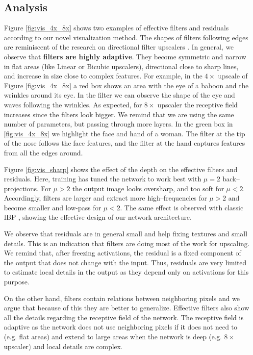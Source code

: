 \documentclass[letterpaper]{article}
\begin{document}
\subsection{Analysis}
\label{ssec:analysis}
Figure \ref{fig:vis_4x_8x} shows two examples of effective filters and residuals according to our novel visualization method. The shapes of filters following edges are reminiscent of the research on directional filter upscalers \cite{VRAlgazi_1991a,XLi_2001a}. In general, we observe that \textbf{filters are highly adaptive}. They become symmetric and narrow in flat areas (like Linear or Bicubic upscalers), directional close to sharp lines, and increase in size close to complex features. For example, in the $4\times$ upscale of Figure \ref{fig:vis_4x_8x} a red box shows an area with the eye of a baboon and the wrinkles around its eye. In the filter we can observe the shape of the eye and waves following the wrinkles. As expected, for $8\times$ upscaler the receptive field increases since the filters look bigger. We remind that we are using the same number of parameters, but passing through more layers. In the green box in \ref{fig:vis_4x_8x} we highlight the face and hand of a woman. The filter at the tip of the nose follows the face features, and the filter at the hand captures features from all the edges around.

Figure \ref{fig:vis_sharp} shows the effect of the depth on the effective filters and residuals. Here, training has tuned the network to work best with $\mu=2$ back--projections. For $\mu>2$ the output image looks oversharp, and too soft for $\mu<2$. Accordingly, filters are larger and extract more high--frequencies for $\mu>2$ and become smaller and low-pass for $\mu<2$. The same effect is observed with classic IBP \cite{Irani_1991a}, showing the effective design of our network architecture.

We observe that residuals are in general small and help fixing textures and small details. This is an indication that filters are doing most of the work for upscaling. We remind that, after freezing activations, the residual is a fixed component of the output that does not change with the input. Thus, residuals are very limited to estimate local details in the output as they depend only on activations for this purpose.

On the other hand, filters contain relations between neighboring pixels and we argue that because of this they are better to generalize. Effective filters also show all the details regarding the receptive field of the network. The receptive field is adaptive as the network does not use neighboring pixels if it does not need to (e.g. flat areas) and extend to large areas when the network is deep (e.g. $8\times$ upscaler) and local details are complex.
\end{document}
